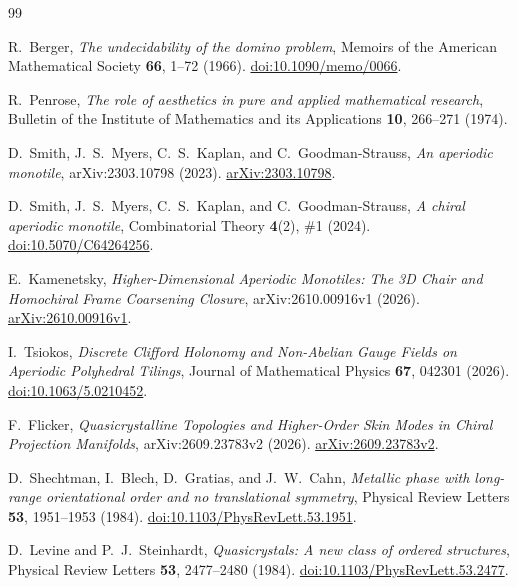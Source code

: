 \documentclass[11pt,a4paper]{article}
\theoremstyle{definition}
\begin{document}
\begin{thebibliography}{99}

R.~Berger, \textit{The undecidability of the domino problem}, Memoirs of the American Mathematical Society \textbf{66}, 1--72 (1966). \href{https://doi.org/10.1090/memo/0066}{doi:10.1090/memo/0066}.

R.~Penrose, \textit{The role of aesthetics in pure and applied mathematical research}, Bulletin of the Institute of Mathematics and its Applications \textbf{10}, 266--271 (1974).

D.~Smith, J.~S.~Myers, C.~S.~Kaplan, and C.~Goodman-Strauss, \textit{An aperiodic monotile}, arXiv:2303.10798 (2023). \href{https://arxiv.org/abs/2303.10798}{arXiv:2303.10798}.

D.~Smith, J.~S.~Myers, C.~S.~Kaplan, and C.~Goodman-Strauss, \textit{A chiral aperiodic monotile}, Combinatorial Theory \textbf{4}(2), \#1 (2024). \href{https://doi.org/10.5070/C64264256}{doi:10.5070/C64264256}.

E.~Kamenetsky, \textit{Higher-Dimensional Aperiodic Monotiles: The 3D Chair and Homochiral Frame Coarsening Closure}, arXiv:2610.00916v1 (2026). \href{https://arxiv.org/abs/2610.00916}{arXiv:2610.00916v1}.

I.~Tsiokos, \textit{Discrete Clifford Holonomy and Non-Abelian Gauge Fields on Aperiodic Polyhedral Tilings}, Journal of Mathematical Physics \textbf{67}, 042301 (2026). \href{https://doi.org/10.1063/5.0210452}{doi:10.1063/5.0210452}.

F.~Flicker, \textit{Quasicrystalline Topologies and Higher-Order Skin Modes in Chiral Projection Manifolds}, arXiv:2609.23783v2 (2026). \href{https://arxiv.org/abs/2609.23783}{arXiv:2609.23783v2}.

D.~Shechtman, I.~Blech, D.~Gratias, and J.~W.~Cahn, \textit{Metallic phase with long-range orientational order and no translational symmetry}, Physical Review Letters \textbf{53}, 1951--1953 (1984). \href{https://doi.org/10.1103/PhysRevLett.53.1951}{doi:10.1103/PhysRevLett.53.1951}.

D.~Levine and P.~J.~Steinhardt, \textit{Quasicrystals: A new class of ordered structures}, Physical Review Letters \textbf{53}, 2477--2480 (1984). \href{https://doi.org/10.1103/PhysRevLett.53.2477}{doi:10.1103/PhysRevLett.53.2477}.


\end{thebibliography}
\end{document}
